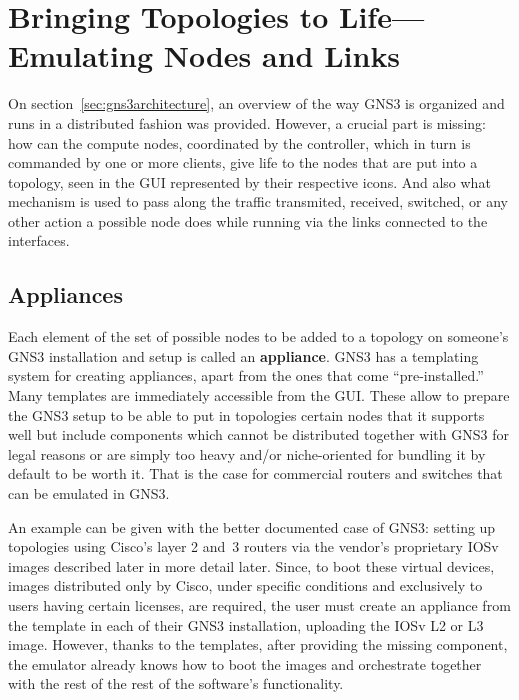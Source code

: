 \section{Bringing Topologies to Life---Emulating Nodes and Links}
\label{sec:gns3emulating}

On section~\ref{sec:gns3architecture}, an overview of the way GNS3 is organized and runs in a distributed fashion was provided.
However, a crucial part is missing: how can the compute nodes, coordinated by the controller, which in turn is commanded by one or more clients, give life to the nodes that are put into a topology, seen in the GUI represented by their respective icons.
And also what mechanism is used to pass along the traffic transmited, received, switched, or any other action a possible node does while running via the links connected to the interfaces.

\subsection{Appliances}
\label{subsec:gns3appliances}

Each element of the set of possible nodes to be added to a topology on someone's GNS3 installation and setup is called an \textbf{appliance}.
GNS3 has a templating system for creating appliances, apart from the ones that come ``pre-installed.''
Many templates are immediately accessible from the GUI.
These allow to prepare the GNS3 setup to be able to put in topologies certain nodes that it supports well but include components which cannot be distributed together with GNS3 for legal reasons or are simply too heavy and/or niche-oriented for bundling it by default to be worth it.
That is the case for commercial routers and switches that can be emulated in GNS3.

An example can be given with the better documented case of GNS3: setting up topologies using Cisco's layer 2 and~3 routers via the vendor's proprietary IOSv images described later in more detail later.
Since, to boot these virtual devices, images distributed only by Cisco, under specific conditions and exclusively to users having certain licenses, are required, the user must create an appliance from the template in each of their GNS3 installation, uploading the IOSv L2 or L3 image.
However, thanks to the templates, after providing the missing component, the emulator already knows how to boot the images and orchestrate together with the rest of the rest of the software's functionality.

